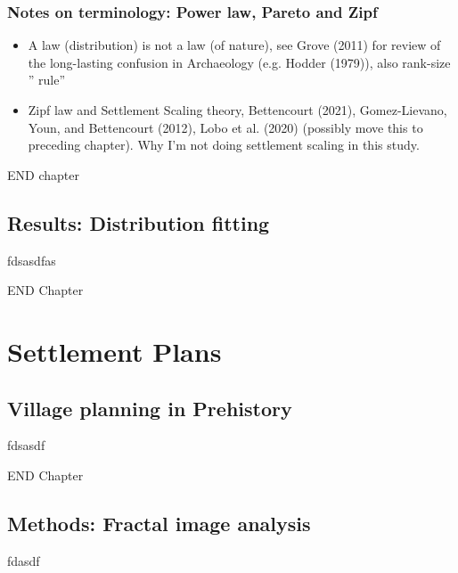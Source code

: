\documentclass[
  12pt,
]{book}
\providecommand{\tightlist}{%
  \setlength{\itemsep}{0pt}\setlength{\parskip}{0pt}}
\begin{document}
\hypertarget{notes-on-terminology-power-law-pareto-and-zipf}{%
\section{Notes on terminology: Power law, Pareto and Zipf}\label{notes-on-terminology-power-law-pareto-and-zipf}}

\begin{itemize}
\tightlist
\item
  A law (distribution) is not a law (of nature), see Grove (2011) for review of the long-lasting confusion in Archaeology (e.g. Hodder (1979)), also rank-size '' rule''
\item
  Zipf law and Settlement Scaling theory, Bettencourt (2021), Gomez-Lievano, Youn, and Bettencourt (2012), Lobo et al. (2020) (possibly move this to preceding chapter). Why I'm not doing settlement scaling in this study.
\end{itemize}

END chapter

\hypertarget{results-distribution-fitting}{%
\chapter{Results: Distribution fitting}\label{results-distribution-fitting}}

fdsasdfas

END Chapter

\hypertarget{part-settlement-plans}{%
\part{Settlement Plans}\label{part-settlement-plans}}

\hypertarget{village-planning-in-prehistory}{%
\chapter{Village planning in Prehistory}\label{village-planning-in-prehistory}}

fdsasdf

END Chapter

\hypertarget{methods-fractal-image-analysis}{%
\chapter{Methods: Fractal image analysis}\label{methods-fractal-image-analysis}}

fdasdf
\end{document}
